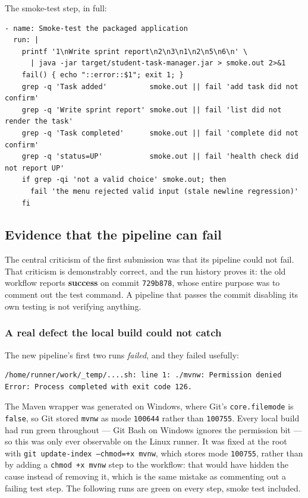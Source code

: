 \documentclass[11pt,a4paper]{article}
\newcommand{\code}[1]{\texttt{\small #1}}
\begin{document}
The smoke-test step, in full:

\begin{lstlisting}[style=yaml]
- name: Smoke-test the packaged application
  run: |
    printf '1\nWrite sprint report\n2\n3\n1\n2\n5\n6\n' \
      | java -jar target/student-task-manager.jar > smoke.out 2>&1
    fail() { echo "::error::$1"; exit 1; }
    grep -q 'Task added'          smoke.out || fail 'add task did not confirm'
    grep -q 'Write sprint report' smoke.out || fail 'list did not render the task'
    grep -q 'Task completed'      smoke.out || fail 'complete did not confirm'
    grep -q 'status=UP'           smoke.out || fail 'health check did not report UP'
    if grep -qi 'not a valid choice' smoke.out; then
      fail 'the menu rejected valid input (stale newline regression)'
    fi
\end{lstlisting}

\subsection{Evidence that the pipeline can fail}
\label{sec:canfail}

The central criticism of the first submission was that its pipeline could not
fail. That criticism is demonstrably correct, and the run history proves it:
the old workflow reports \textbf{success} on commit \code{729b878}, whose
entire purpose was to comment out the test command. A pipeline that passes the
commit disabling its own testing is not verifying anything.

\subsubsection*{A real defect the local build could not catch}

The new pipeline's first two runs \emph{failed}, and they failed usefully:

\begin{lstlisting}[style=plain]
/home/runner/work/_temp/....sh: line 1: ./mvnw: Permission denied
Error: Process completed with exit code 126.
\end{lstlisting}

\noindent The Maven wrapper was generated on Windows, where Git's
\code{core.filemode} is \code{false}, so Git stored \code{mvnw} as mode
\code{100644} rather than \code{100755}. Every local build had run green
throughout --- Git Bash on Windows ignores the permission bit --- so this was
only ever observable on the Linux runner. It was fixed at the root with
\code{git update-index --chmod=+x mvnw}, which stores mode \code{100755},
rather than by adding a \code{chmod +x mvnw} step to the workflow: that would
have hidden the cause instead of removing it, which is the same mistake as
commenting out a failing test step. The following runs are green on every
step, smoke test included.
\end{document}
